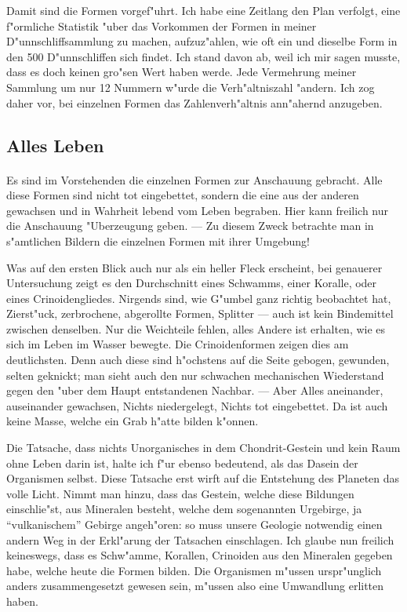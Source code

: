 \documentclass[a4paper, 11pt, oneside]{article}
\begin{document}
Damit sind die Formen vorgef"uhrt. Ich habe eine Zeitlang den Plan verfolgt, eine f"ormliche Statistik "uber das Vorkommen der Formen in meiner D"unnschliffsammlung zu machen, aufzuz"ahlen, wie oft ein und dieselbe Form in den 500 D"unnschliffen sich findet. Ich stand davon ab, weil ich mir sagen musste, dass es doch keinen gro"sen Wert haben werde. Jede Vermehrung meiner Sammlung um nur 12 Nummern w"urde die Verh"altniszahl "andern. Ich zog daher vor, bei einzelnen Formen das Zahlenverh"altnis ann"ahernd anzugeben.
\clearpage
\subsection{Alles Leben}
\paragraph{}
Es sind im Vorstehenden die einzelnen Formen zur Anschauung gebracht. Alle diese Formen sind nicht tot eingebettet, sondern die eine aus der anderen gewachsen und in Wahrheit lebend vom Leben begraben. Hier kann freilich nur die Anschauung "Uberzeugung geben. --- Zu diesem Zweck betrachte man in s"amtlichen Bildern die einzelnen Formen mit ihrer Umgebung!

Was auf den ersten Blick auch nur als ein heller Fleck erscheint, bei genauerer Untersuchung zeigt es den Durchschnitt eines Schwamms, einer Koralle, oder eines Crinoidengliedes. Nirgends sind, wie G"umbel ganz richtig beobachtet hat, Zierst"uck, zerbrochene, abgerollte Formen, Splitter --- auch ist kein Bindemittel zwischen denselben. Nur die Weichteile fehlen, alles Andere ist erhalten, wie es sich im Leben im Wasser bewegte. Die Crinoidenformen zeigen dies am deutlichsten. Denn auch diese sind h"ochstens auf die Seite gebogen, gewunden, selten geknickt; man sieht auch den nur schwachen mechanischen Wiederstand gegen den "uber dem Haupt entstandenen Nachbar. --- Aber Alles aneinander, auseinander gewachsen, Nichts niedergelegt, Nichts tot eingebettet. Da ist auch keine Masse, welche ein Grab h"atte bilden k"onnen.

Die Tatsache, dass nichts Unorganisches in dem Chondrit-Gestein und kein Raum ohne Leben darin ist, halte ich f"ur ebenso bedeutend, als das Dasein der Organismen selbst. Diese Tatsache erst wirft auf die Entstehung des Planeten das volle Licht. Nimmt man hinzu, dass das Gestein, welche diese Bildungen einschlie"st, aus Mineralen besteht, welche dem sogenannten Urgebirge, ja "`vulkanischem"' Gebirge angeh"oren: so muss unsere Geologie notwendig einen andern Weg in der Erkl"arung der Tatsachen einschlagen. Ich glaube nun freilich keineswegs, dass es Schw"amme, Korallen, Crinoiden aus den Mineralen gegeben habe, welche heute die Formen bilden. Die Organismen m"ussen urspr"unglich anders zusammengesetzt gewesen sein, m"ussen also eine Umwandlung erlitten haben.
\end{document}
